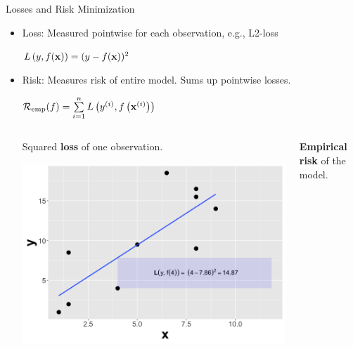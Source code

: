 \documentclass[11pt,compress,t,notes=noshow, xcolor=table]{beamer}
\begin{document}
\begin{vbframe}{Losses and Risk Minimization}

\begin{itemize}
\item Loss: Measured pointwise for each observation, e.g., L2-loss 
\begin{center}
$L\left(y, f(\mathbf{x})\right) = (y - f(\mathbf{x}))^2$
\end{center}
\item Risk: Measures risk of entire model. Sums up pointwise losses.
\begin{center}
$ \mathcal{R}_{\text{emp}}(f) = \sum\limits_{i=1}^n L\left(y^{(i)}, f\left(\mathbf{x}^{(i)}\right)\right) $
\end{center} 
\hspace{1cm}


\begin{columns}  
\begin{column}{0.5\textwidth} 
\small Squared \textbf{loss} of one observation.

  \begin{center}
    \includegraphics[width=\textwidth]{slides/ml-basics/figure_man/nutshell-ml-basics-loss-regression.png} 
  \end{center}
\end{column}  


\begin{column}{0.48\textwidth} 
\small \textbf{Empirical risk} of the model.


\end{column}
\end{columns}
\end{itemize}
\end{vbframe}
\end{document}
